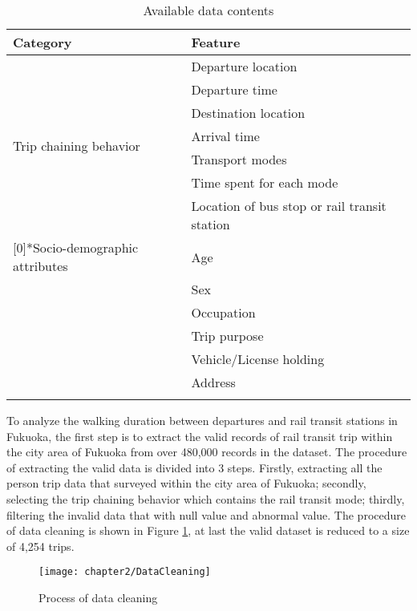 \begin{table}[htbp]
	\centering
	\caption{Available data contents}
	\label{tab:chp2:Data}
	\small
	\renewcommand{\arraystretch}{1.25} %
	\begin{tabular}{ll}
		\Xhline{1.5pt}
		Category                      & Feature\\
		\midrule
		\multirow{7}[0]{*}{Trip chaining behavior} 
		& Departure location \\
		& Departure time \\
		& Destination location \\
		& Arrival time \\
		& Transport modes \\
		& Time spent for each mode \\
		& Location of bus stop or rail transit station \\
		\Xhline{0.5pt}
		
		\multirow{6}[0]{*}{Socio-demographic attributes}
		& Age \\
		& Sex \\
		& Occupation \\
		& Trip purpose \\
		& Vehicle/License holding \\
		& Address \\
		\Xhline{1.5pt}
	\end{tabular}
\end{table}

%
To analyze the walking duration between departures and rail transit stations in Fukuoka, the first step is to extract the valid records of rail transit trip within the city area of Fukuoka from over 480,000 records in the dataset. The procedure of extracting the valid data is divided into 3 steps. Firstly, extracting all the person trip data that surveyed within the city area of Fukuoka; secondly, selecting the trip chaining behavior which contains the rail transit mode; thirdly, filtering the invalid data that with null value and abnormal value. The procedure of data cleaning is shown in Figure \ref{fig:chp2:DataCleaning}, at last the valid dataset is reduced to a size of 4,254 trips.

\begin{figure}[htbp]
	\centering
	\texttt{[image: chapter2/DataCleaning]}
	\caption{Process of data cleaning}
	\label{fig:chp2:DataCleaning}
\end{figure}

